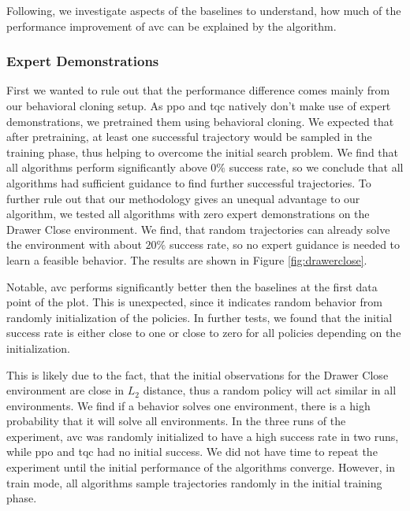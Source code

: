 Following, we investigate aspects of the baselines to understand, how much of the performance improvement of \ac{avc} can be explained by the algorithm. 

\subsubsection{Expert Demonstrations}
First we wanted to rule out that the performance difference comes mainly from our behavioral cloning setup. As \ac{ppo} and \ac{tqc} natively don't make use of expert demonstrations,
we pretrained them using behavioral cloning. We expected that after pretraining, at least one successful trajectory would be sampled in the training phase, thus
helping to overcome the initial search problem. We find that all algorithms perform significantly above $0\%$ success rate, so we conclude that all algorithms had
sufficient guidance to find further successful trajectories. To further rule out that our methodology gives an unequal advantage to our algorithm, we tested all algorithms with 
zero expert demonstrations on the 
Drawer Close environment. We find, that random trajectories can already solve the environment with about $20\%$ success rate, so no expert guidance is needed to learn a feasible behavior.
The results are shown in Figure \ref{fig:drawerclose}.

Notable, \ac{avc} performs significantly better then the baselines at the first data point of the plot. This is unexpected, since it indicates 
random behavior from randomly initialization of the policies. In further tests, we found that the initial success rate is either close to one or close to zero for all policies depending 
on the initialization. 

This is likely due to the fact, that the initial observations for the Drawer Close environment are close in $L_2$ distance, thus a random policy will act similar in all environments. 
We find if a behavior solves one environment, there is a high probability that it will solve all environments. In the three runs of the experiment, \ac{avc} was randomly initialized to have a high success rate in two runs, while \ac{ppo} and \ac{tqc} had no 
initial success. We did not have time to repeat the experiment until the initial performance of the algorithms converge. However, in train mode, 
all algorithms sample trajectories randomly in the initial training phase. 

